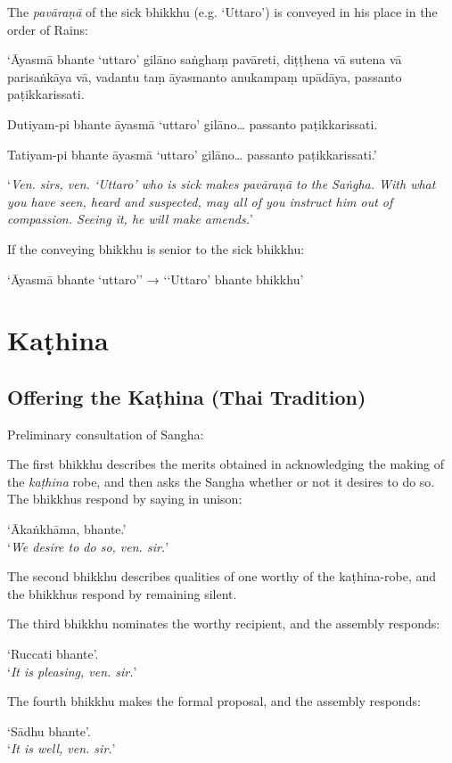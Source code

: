The \emph{pavāraṇā} of the sick bhikkhu (e.g. ‘Uttaro’) is conveyed in his place
in the order of Rains:

‘Āyasmā bhante ‘uttaro’ gilāno saṅghaṃ pavāreti, diṭṭhena vā sutena vā
parisaṅkāya vā, vadantu taṃ āyasmanto anukampaṃ upādāya, passanto
paṭikkarissati.

Dutiyam-pi bhante āyasmā ‘uttaro’ gilāno… passanto paṭikkarissati.

Tatiyam-pi bhante āyasmā ‘uttaro’ gilāno… passanto paṭikkarissati.’

‘\emph{Ven. sirs, ven. ‘Uttaro’ who is sick makes pavāraṇā to the Saṅgha. With
  what you have seen, heard and suspected, may all of you instruct him out of
  compassion. Seeing it, he will make amends.}’


If the conveying bhikkhu is senior to the sick bhikkhu:

‘Āyasmā bhante ‘uttaro’’ → ‘‘Uttaro’ bhante bhikkhu’

\section{Kaṭhina}

\subsection{Offering the Kaṭhina (Thai Tradition)}

Preliminary consultation of Sangha:

The first bhikkhu describes the merits obtained in acknowledging the making of
the \emph{kaṭhina} robe, and then asks the Sangha whether or not it desires to
do so. The bhikkhus respond by saying in unison:

‘Ākaṅkhāma, bhante.’\\
‘\emph{We desire to do so, ven. sir.}’

The second bhikkhu describes qualities of one worthy of the kaṭhina-robe, and
the bhikkhus respond by remaining silent.

The third bhikkhu nominates the worthy recipient, and the assembly responds:

‘Ruccati bhante’.\\
‘\emph{It is pleasing, ven. sir.}’

The fourth bhikkhu makes the formal proposal, and the assembly responds:

‘Sādhu bhante’.\\
‘\emph{It is well, ven. sir.}’

